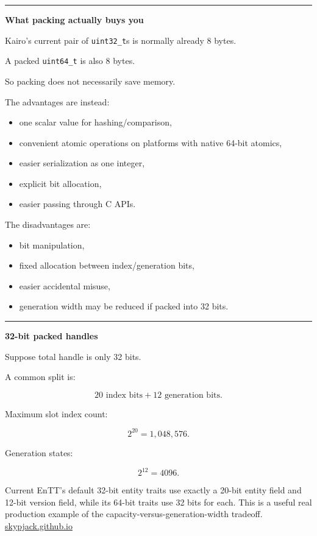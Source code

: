 \begin{center}\rule{0.5\linewidth}{0.5pt}\end{center}

\textbf{What packing actually buys you}

Kairo's current pair of \texttt{uint32\_t}s is normally already 8 bytes.

A packed \texttt{uint64\_t} is also 8 bytes.

So packing does not necessarily save memory.

The advantages are instead:

\begin{itemize}
\tightlist
\item
  one scalar value for hashing/comparison,
\item
  convenient atomic operations on platforms with native 64-bit atomics,
\item
  easier serialization as one integer,
\item
  explicit bit allocation,
\item
  easier passing through C APIs.
\end{itemize}

The disadvantages are:

\begin{itemize}
\tightlist
\item
  bit manipulation,
\item
  fixed allocation between index/generation bits,
\item
  easier accidental misuse,
\item
  generation width may be reduced if packed into 32 bits.
\end{itemize}

\begin{center}\rule{0.5\linewidth}{0.5pt}\end{center}

\textbf{32-bit packed handles}

Suppose total handle is only 32 bits.

A common split is:

\[
20\text{ index bits}
+
12\text{ generation bits}.
\]

Maximum slot index count:

\[
2^{20}
=
1,048,576.
\]

Generation states:

\[
2^{12}
=
4096.
\]

Current EnTT's default 32-bit entity traits use exactly a 20-bit entity field and 12-bit version field, while its 64-bit traits use 32 bits for each. This is a useful real production example of the capacity-versus-generation-width tradeoff. \href{https://skypjack.github.io/entt/entity_8hpp_source.html?utm_source=chatgpt.com}{skypjack.github.io}

